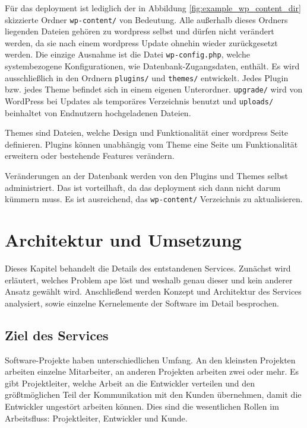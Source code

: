 Für das \gls{deployment} ist lediglich der in Abbildung \ref{fig:example_wp_content_dir} skizzierte Ordner \lstinline!wp-content/! von Bedeutung. Alle außerhalb dieses Ordners liegenden Dateien gehören zu \gls{wordpress} selbst und dürfen nicht verändert werden, da sie nach einem \gls{wordpress} Update ohnehin wieder zurückgesetzt werden. Die einzige Ausnahme ist die Datei \lstinline!wp-config.php!, welche systembezogene Konfigurationen, wie Datenbank-Zugangsdaten, enthält. Es wird ausschließlich in den Ordnern \lstinline!plugins/! und \lstinline!themes/! entwickelt. Jedes Plugin bzw. jedes Theme befindet sich in einem eigenen Unterordner. \lstinline!upgrade/! wird von WordPress bei Updates als temporäres Verzeichnis benutzt und \lstinline!uploads/! beinhaltet von Endnutzern hochgeladenen Dateien.

Themes sind Dateien, welche Design und Funktionalität einer \gls{wordpress} Seite definieren. Plugins können unabhängig vom Theme eine Seite um Funktionalität erweitern oder bestehende Features verändern.

Veränderungen an der Datenbank werden von den Plugins und Themes selbst administriert. Das ist vorteilhaft, da das \gls{deployment} sich dann nicht darum kümmern muss. Es ist ausreichend, das \lstinline!wp-content/! Verzeichnis zu aktualisieren.




\section{Architektur und Umsetzung} %
\label{sec:architektur_und_umsetzung}

Dieses Kapitel behandelt die Details des entstandenen Services. Zunächst wird erläutert, welches Problem \gls{ape} löst und weshalb genau dieser und kein anderer Ansatz gewählt wird. Anschließend werden Konzept und Architektur des Services analysiert, sowie einzelne Kernelemente der Software im Detail besprochen.

\subsection{Ziel des Services} %
\label{sub:ziel_des_services}

Software-Projekte haben unterschiedlichen Umfang. An den kleinsten Projekten arbeiten einzelne Mitarbeiter, an anderen Projekten arbeiten zwei oder mehr. Es gibt Projektleiter, welche Arbeit an die Entwickler verteilen und den größtmöglichen Teil der Kommunikation mit den Kunden übernehmen, damit die Entwickler ungestört arbeiten können. Dies sind die wesentlichen Rollen im Arbeitsfluss: Projektleiter, Entwickler und Kunde.

